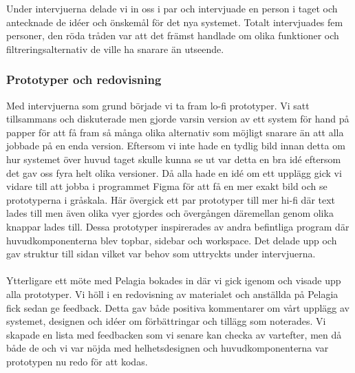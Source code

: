 \noindent
Under intervjuerna delade vi in oss i par och intervjuade en person i taget och antecknade de idéer och önskemål för det nya systemet. Totalt intervjuades fem personer, den röda tråden var att det främst handlade om olika funktioner och filtreringsalternativ de ville ha snarare än utseende. 

\subsubsection{Prototyper och redovisning}
Med intervjuerna som grund började vi ta fram lo-fi prototyper. Vi satt tillsammans och diskuterade men gjorde varsin version av ett system för hand på papper för att få fram så många olika alternativ som möjligt snarare än att alla jobbade på en enda version. Eftersom vi inte hade en tydlig bild innan detta om hur systemet över huvud taget skulle kunna se ut var detta en bra idé eftersom det gav oss fyra helt olika versioner. Då alla hade en idé om ett upplägg gick vi vidare till att jobba i programmet Figma för att få en mer exakt bild och se prototyperna i gråskala. Här övergick ett par prototyper till mer hi-fi där text lades till men även olika vyer gjordes och övergången däremellan genom olika knappar lades till. Dessa prototyper inspirerades av andra befintliga program där huvudkomponenterna blev topbar, sidebar och workspace. Det delade upp och gav struktur till sidan vilket var behov som uttryckts under intervjuerna.
\\
\\
Ytterligare ett möte med Pelagia bokades in där vi gick igenom och visade upp alla prototyper. Vi höll i en redovisning av materialet och anställda på Pelagia fick sedan ge feedback. Detta gav både positiva kommentarer om vårt upplägg av systemet, designen och idéer om förbättringar och tillägg som noterades. Vi skapade en lista med feedbacken som vi senare kan checka av vartefter, men då både de och vi var nöjda med helhetsdesignen och huvudkomponenterna var prototypen nu redo för att kodas. 

